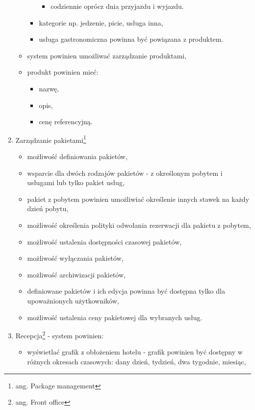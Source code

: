 \documentclass[a4paper,onecolumn,oneside,11pt,wide,floatssmall]{mwrep}
\theoremstyle{definition}
\theoremstyle{plain}%
\theoremstyle{remark}
\begin{document}
\begin{enumerate}
\begin{itemize}
\begin{itemize}
\begin{itemize}
              \item codziennie oprócz dnia przyjazdu i wyjazdu.
            \end{itemize}
          \item kategorie np. jedzenie, picie, usługa inna,
          \item usługa gastronomiczna powinna być powiązana z produktem.
        \end{itemize}
        \item system powinien umożliwać zarządzanie produktami,
        \item produkt powinien mieć:
          \begin{itemize}
            \item nazwę,
            \item opis,
            \item cenę referencyjną.
          \end{itemize}
    \end{itemize}
  \item Zarządzanie pakietami\footnote{ang. Package management}
    \begin{itemize}
      \item możliwość definiowania pakietów,
      \item wsparcie dla dwóch rodzajów pakietów - z określonym pobytem i usługami lub tylko pakiet usług,
      \item pakiet z pobytem powinien umożliwiać określenie innych stawek na każdy dzień pobytu,
      \item możliwość określenia polityki odwołania rezerwacji dla pakietu z pobytem,
      \item możliwość ustalenia dostępności czasowej pakietów,
      \item możliwość wyłączania pakietów,
      \item możliwość archiwizacji pakietów,
      \item definiowane pakietów i ich edycja powinna być dostępna tylko dla upoważnionych użytkowników,
      \item możliwość ustalenia ceny pakietowej dla wybranych usług.
    \end{itemize}
  \item Recepcja\footnote{ang. Front office} - system powinien:
    \begin{itemize}
      \item wyświetlać grafik z obłożeniem hotelu - grafik powinien być dostępny w różnych okresach czasowych: dany dzień, tydzień, dwa tygodnie, miesiąc,

\end{itemize}
\end{enumerate}
\end{document}
